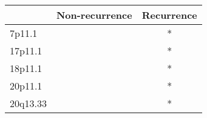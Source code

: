 \begin{tabular}{lcc}
\toprule
{} & Non-recurrence & Recurrence \\
\midrule
7p11.1   &                &          * \\
17p11.1  &                &          * \\
18p11.1  &                &          * \\
20p11.1  &                &          * \\
20q13.33 &                &          * \\
\bottomrule
\end{tabular}
